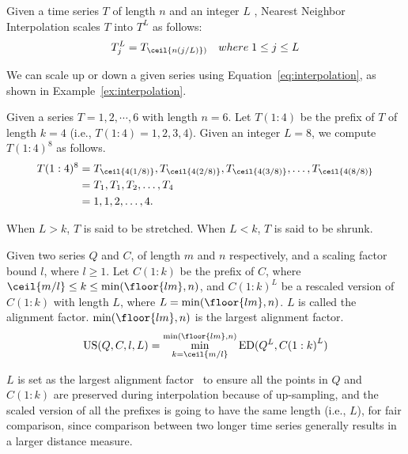 \begin{definition}
    \label{def:interpolation}
    Given a time series $T$ of length $n$ and an integer $L$  , Nearest Neighbor Interpolation scales $T$ into $T^L$ as follows:
    \begin{equation} 
        \label{eq:interpolation}
        T^L_j = T_{\ceil{n(j/L)})} \quad where\; 1 \leq j \leq L
    \end{equation}
\end{definition}
We can scale up or down a given series using Equation~\ref{eq:interpolation}, as shown in Example~\ref{ex:interpolation}.

\begin{example}
    \label{ex:interpolation}
    Given a series $T = 1, 2, \cdots, 6$ with length $n = 6$. 
    Let $T(1:4)$ be the prefix of $T$ of length $k = 4$ (i.e., $T(1:4) = 1, 2, 3, 4$).
    Given an integer $L = 8$, we compute $T(1:4)^8$ as follows.
    \begin{align*}
        T(1:4)^8 &= T_{\ceil{4(1/8)}}, T_{\ceil{4(2/8)}}, T_{\ceil{4(3/8)}}, \dots, T_{\ceil{4(8/8)}} \\
                 &= T_1, T_1, T_2, \dots, T_4 \\
                 &= 1, 1, 2, \dots, 4.
    \end{align*}
\end{example}

When $L > k$, $T$ is said to be stretched. When $L < k$, $T$ is said to be shrunk.

\begin{definition}
    \label{def:us}
    Given two series $Q$ and $C$, of length $m$ and $n$ respectively, and a scaling factor bound $l$, where $l \geq 1$.
    Let $C(1:k)$ be the prefix of $C$, where $\ceil{m/l} \leq k \leq \min(\floor{lm}, n)$, and ${C(1:k)}^L$ be a rescaled version of $C(1:k)$ with length $L$, where $L = \min (\floor{lm}, n)$. 
    $L$ is called the alignment factor.
    $\min (\floor{lm}, n)$ is the largest alignment factor.
    \begin{equation} 
        \label{eq:us}
        \operatorname{US}(Q,C,l,L) = \min_{k=\ceil{m/l}}^{\min (\floor{lm}, n)} \operatorname{ED}(Q^L, {C(1:k)}^L)
    \end{equation}
\end{definition}
$L$ is set as the largest alignment factor~\cite{shen2018accelerating} to ensure all the points in $Q$ and $C(1:k)$ are preserved during interpolation because of up-sampling, and the scaled version of all the prefixes is going to have the same length (i.e., $L$), for fair comparison, since comparison between two longer time series generally results in a larger distance measure.

